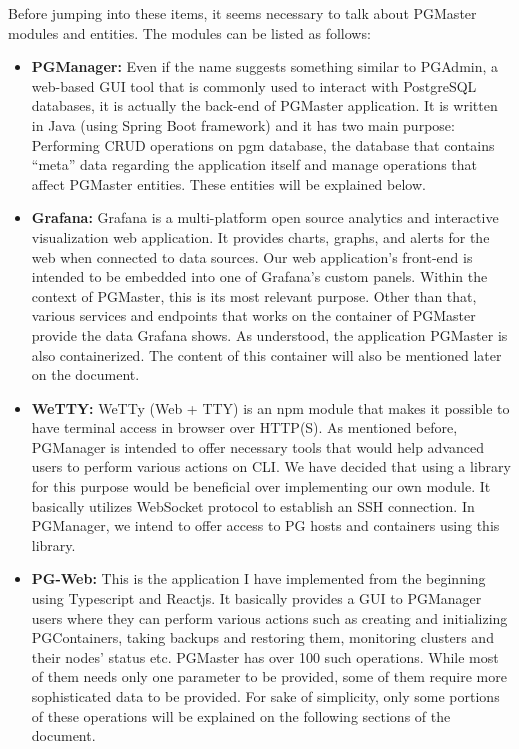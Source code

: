 Before jumping into these items, it seems necessary to talk about PGMaster 
modules and entities. The modules can be listed as follows:

\begin{itemize}
    \item \textbf{PGManager:} Even if the name suggests something similar to 
    PGAdmin, a web-based GUI tool that is commonly used to interact with 
    PostgreSQL databases, it is actually the back-end of PGMaster application. 
    It is written in Java (using Spring Boot framework) and it has two main 
    purpose: Performing CRUD operations on pgm database, the database that 
    contains ``meta'' data regarding the application itself and manage 
    operations that affect PGMaster entities. These entities will be 
    explained below.
    \item \textbf{Grafana:} Grafana is a multi-platform open source analytics 
    and interactive visualization web application. It provides charts, 
    graphs, and alerts for the web when connected to data sources. Our 
    web application's front-end is intended to be embedded into one of 
    Grafana's custom panels. Within the context of PGMaster, this is its 
    most relevant purpose. Other than that, various services and endpoints 
    that works on the container of PGMaster provide the data Grafana shows. 
    As understood, the application PGMaster is also containerized. The 
    content of this container will also be mentioned later on the document.
    \item \textbf{WeTTY:} WeTTy (Web + TTY) is an npm module that makes it 
    possible to have terminal access in browser over HTTP(S). As mentioned 
    before, PGManager is intended to offer necessary tools that would help 
    advanced users to perform various actions on CLI. We have decided that 
    using a library for this purpose would be beneficial over implementing 
    our own module. It basically utilizes WebSocket protocol to establish 
    an SSH connection. In PGManager, we intend to offer access to PG hosts 
    and containers using this library.
    \item \textbf{PG-Web:} This is the application I have implemented from 
    the beginning using Typescript and Reactjs. It basically provides a 
    GUI to PGManager users where they can perform various actions such as 
    creating and initializing PGContainers, taking backups and restoring 
    them, monitoring clusters and their nodes' status etc. PGMaster has 
    over 100 such operations. While most of them needs only one parameter 
    to be provided, some of them require more sophisticated data to be 
    provided. For sake of simplicity, only some portions of these operations 
    will be explained on the following sections of the document.
\end{itemize}


